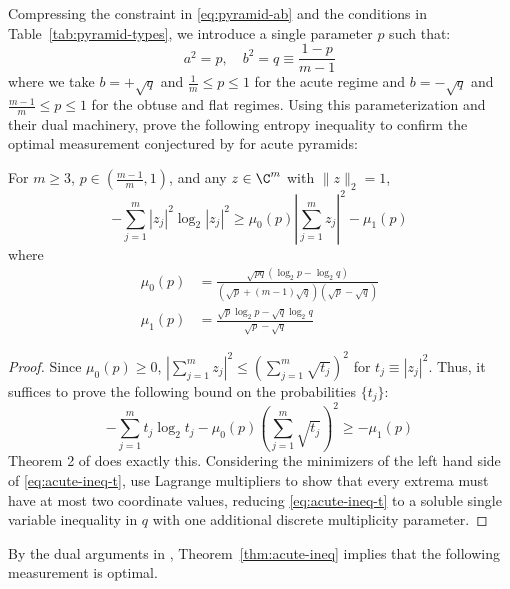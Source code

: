 \documentclass[11pt]{article}
\begin{document}
Compressing the constraint in \eqref{eq:pyramid-ab} and the conditions in Table~\ref{tab:pyramid-types}, we introduce a single parameter $p$ such that:
\begin{equation}\label{eq:ab-p}
    a^2=p,\quad b^2=q\equiv \frac{1-p}{m-1}
\end{equation}
where we take $b=+\sqrt q$ and $\frac 1 m \leq p\leq 1$ for the acute regime and $b=-\sqrt q $ and $ \frac{m-1}{m}\leq p \leq 1 $ for the obtuse and flat regimes. Using this parameterization and their dual machinery, \citep{holevo2025quantum} prove the following entropy inequality to confirm the optimal measurement conjectured by \citep{englert2010well} for acute pyramids:
\begin{theorem}\label{thm:acute-ineq}
   For $m\geq 3$, $p\in \left(\frac{m-1}{m},1\right)$, and any $z\in \C^m$ with $\|z\|_2=1$,
   \begin{equation}
       -\sum_{j=1}^m|z_j|^2 \log_2 |z_j|^2 \geq \mu_0(p)\left|\sum_{j=1}^m z_j\right|^2-\mu_1(p)
   \end{equation}
   where 
   \begin{equation}
   \begin{aligned}
       \mu_0(p)&=\frac{\sqrt{pq}(\log_2 p-\log_2 q)}{(\sqrt p+(m-1)\sqrt q)(\sqrt p-\sqrt q)}\\
       \mu_1(p)&=\frac{\sqrt p\log_2 p-\sqrt q \log_2 q }{\sqrt p-\sqrt q }
   \end{aligned}
   \end{equation}
\end{theorem}
\begin{proof}
    Since $\mu_0(p)\geq 0$, $\left|\sum_{j=1}^mz_j\right|^2\leq \left(\sum_{j=1}^m \sqrt{t_j}\right)^2 $ for $t_j\equiv |z_j|^2$. Thus, it suffices to prove the following bound on the probabilities $\{t_j\}$:
    \begin{equation}\label{eq:acute-ineq-t}
        -\sum_{j=1}^m t_j \log_2 t_j -\mu_0(p)\left(\sum_{j=1}^m \sqrt{t_j}\right)^2\geq -\mu_1(p)
    \end{equation}
    Theorem 2 of \citep{holevo2025quantum} does exactly this. Considering the minimizers of the left hand side of \eqref{eq:acute-ineq-t}, \citep{holevo2025quantum} use Lagrange multipliers to show that every extrema must have at most two coordinate values, reducing \eqref{eq:acute-ineq-t} to a soluble single variable inequality in $q$ with one additional discrete multiplicity parameter. 
\end{proof}
By the dual arguments in \citep{holevo2025quantum}, Theorem~\ref{thm:acute-ineq} implies that the following measurement is optimal. 
\end{document}
